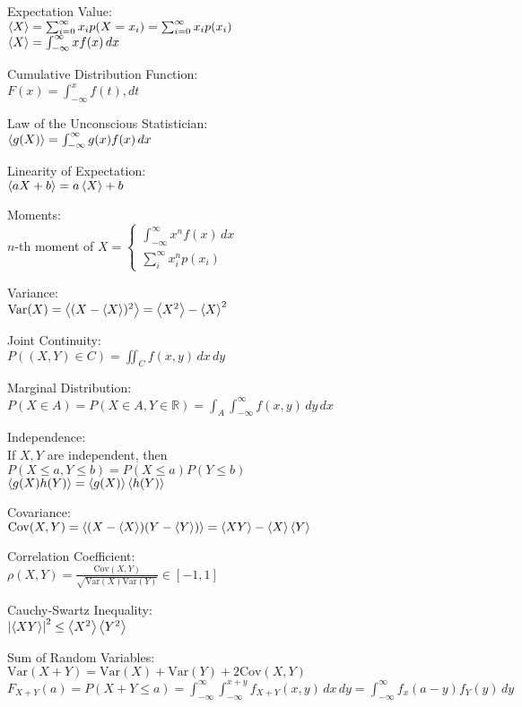 \documentclass[12pt,landscape]{article}
\newcommand{\tab}{\hspace{.02\textwidth}}
\newcommand{\ds}{\displaystyle}
\newcommand{\Var}[1]{\mathrm{Var}(#1)}
\newcommand{\Cov}[1]{\mathrm{Cov}(#1)}
\theoremstyle{definition}
\begin{document}
\begin{multicols}{3}
Expectation Value:\\
\tab $\expval{X} = \sum_{i=0}^{\infty} x_i p(X = x_i) = \sum_{i=0}^{\infty} x_i p(x_i)$\\
\tab $\expval{X} = \int_{-\infty}^\infty xf(x)\,dx$

Cumulative Distribution Function:\\
\tab $F(x) = \int_{-\infty}^{x} f(t),dt$

Law of the Unconscious Statistician:\\
\tab $\expval{g(X)} = \int_{-\infty}^{\infty}g(x)f(x)\,dx$

Linearity of Expectation:\\
\tab $\expval{aX+b} = a\expval{X} + b$

Moments:\\
\tab $n$-th moment of $X = \begin{cases}
\int_{-\infty}^{\infty}x^n f(x)\,dx & \,\\
\sum_{i}^{\infty} x_i^n p(x_i) & \,
\end{cases}$

Variance:\\
\tab $\Var{X} = \expval{(X-\expval{X})^2} = \expval{X^2} - \expval{X}^2$

Joint Continuity:\\
\tab $P((X,Y)\in C) = \iint_C f(x,y)\,dx\,dy$

Marginal Distribution:\\
\tab $P(X\in A) = P(X \in A, Y \in \mathbb{R}) = \int_A \int_{-\infty}^{\infty}f(x,y)\,dy\,dx$

Independence:\\
If $X,Y$ are independent, then\\
\tab $P(X\leq a, Y\leq b) = P(X\leq a)P(Y\leq b)$\\
\tab $\expval{g(X)h(Y)} = \expval{g(X)}\expval{h(Y)}$

Covariance:\\
\tab $\Cov{X,Y} = \expval{(X-\expval{X})(Y-\expval{Y})} = \expval{XY} - \expval{X}\expval{Y}$

Correlation Coefficient:\\
\tab $\ds \rho(X,Y) = \frac{\Cov{X,Y}}{\sqrt{\Var{X}\Var{Y}}} \in [-1,1]$

Cauchy-Swartz Inequality:\\
\tab $\abs{\expval{XY}}^2 \leq \expval{X^2}\expval{Y^2}$

Sum of Random Variables:\\
\tab $\Var{X+Y} = \Var{X} + \Var{Y} + 2\Cov{X,Y}$\\
\tab $\ds F_{X+Y}(a) = P(X+Y \leq a) = \int_{-\infty}^{\infty}\int_{-\infty}^{x+y}f_{X+Y}(x,y)\,dx\,dy = \int_{-\infty}^{\infty}f_x(a-y)f_Y(y)\,dy$


\end{multicols}
\end{document}
